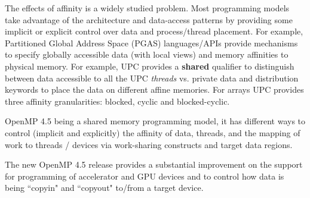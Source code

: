 The effects of affinity is a widely studied problem. Most programming models 
take advantage of the architecture and data-access patterns by providing some 
implicit or explicit control over data and process/thread placement. For example,
Partitioned Global Address Space (PGAS) languages/APIs provide mechanisms to specify 
globally accessible data (with local views) and memory affinities to physical memory. 
For example, UPC provides a \textbf{shared} qualifier to distinguish between data 
accessible to all the UPC \textit{threads} vs. private data and distribution keywords to place
the data on different affine memories. For arrays UPC provides 
three affinity granularities: blocked, cyclic and blocked-cyclic. 

OpenMP 4.5 being a shared memory programming model, it has 
different ways to control (implicit and explicitly) the affinity of data, threads, and the mapping of work to threads / devices via
work-sharing constructs and target data regions.

The new OpenMP 4.5 release provides a substantial 
improvement on the support for programming of accelerator and GPU devices and to control
how data is being ``copyin" and ``copyout" to/from a target device.

